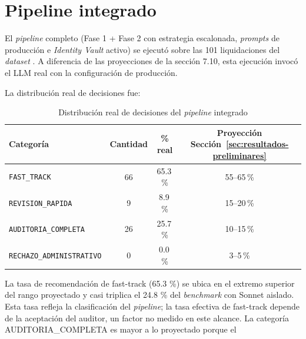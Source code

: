 \section{Pipeline integrado}

El \textit{pipeline} completo (Fase 1 + Fase 2 con estrategia escalonada, \textit{prompts} de producción e \textit{Identity Vault} activo) se ejecutó sobre las 101 liquidaciones del \textit{dataset} . A diferencia de las proyecciones de la sección 7.10, esta ejecución invocó el LLM real con la configuración de producción.

La distribución real de decisiones fue:

\begin{table}[H]
    \centering
    \caption{Distribución real de decisiones del \textit{pipeline} integrado}
    \label{tab:distribucion-decisiones-pipeline}

    \setlength{\tabcolsep}{10pt}
    \renewcommand{\arraystretch}{1.25}

    \begin{tabular}{
        l
        c
        c
        c
    }
        \toprule
        \textbf{Categoría}
        & \textbf{Cantidad}
        & \textbf{\% real}
        & \textbf{Proyección Sección~\ref{sec:resultados-preliminares}} \\
        \midrule

        \texttt{FAST\_TRACK}
        & 66
        & 65.3\,\%
        & 55--65\,\% \\

        \texttt{REVISION\_RAPIDA}
        & 9
        & 8.9\,\%
        & 15--20\,\% \\

        \texttt{AUDITORIA\_COMPLETA}
        & 26
        & 25.7\,\%
        & 10--15\,\% \\

        \texttt{RECHAZO\_ADMINISTRATIVO}
        & 0
        & 0.0\,\%
        & 3--5\,\% \\

        \bottomrule
    \end{tabular}
\end{table}

La tasa de recomendación de fast-track (65.3 \%) se ubica en el extremo superior del rango proyectado y casi triplica el 24.8 \% del \textit{benchmark} con Sonnet aislado. Esta tasa refleja la clasificación del \textit{pipeline}; la tasa efectiva de fast-track depende de la aceptación del auditor, un factor no medido en este alcance. La categoría AUDITORIA\_COMPLETA es mayor a lo proyectado porque el

